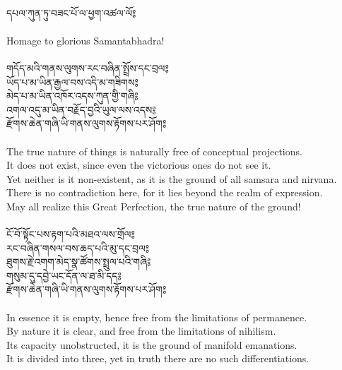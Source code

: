 

\\

\scriptsize
\ti དཔལ་ཀུན་ཏུ་བཟང་པོ་ལ་ཕྱག་འཚལ་ལོ༔\\
\\
\ru Homage to glorious Samantabhadra!
\normalsize
\\
\\
\ti
གདོད་མའི་གནས་ལུགས་རང་བཞིན་སྤྲོས་དང་བྲལ༔\\
ཡོད་པ་མ་ཡིན་རྒྱལ་བས་འདི་མ་གཟིགས༔\\
མེད་པ་མ་ཡིན་འཁོར་འདས་ཀུན་གྱི་གཞི༔\\
འགལ་འདུ་མ་ཡིན་བརྗོད་བྱའི་ཡུལ་ལས་འདས༔\\
རྫོགས་ཆེན་གཞི་ཡི་གནས་ལུགས་རྟོགས་པར་ཤོག༔\\
\\
\ru The true nature of things is naturally free of conceptual projections.\\
It does not exist, since even the victorious ones do not see it.\\
Yet neither is it non-existent, as it is the ground of all samsara and nirvana.\\
There is no contradiction here, for it lies beyond the realm of expression.\\
May all realize this Great Perfection, the true nature of the ground!\\
\\
\newpage
\ti ངོ་བོ་སྟོང་པས་རྟག་པའི་མཐའ་ལས་གྲོལ༔\\
རང་བཞིན་གསལ་བས་ཆད་པའི་མུ་དང་བྲལ༔\\
ཐུགས་རྗེ་འགག་མེད་སྣ་ཚོགས་སྤྲུལ་པའི་གཞི༔\\
གསུམ་དུ་དབྱེ་ཡང་དོན་ལ་ཐ་མི་དད༔\\
རྫོགས་ཆེན་གཞི་ཡི་གནས་ལུགས་རྟོགས་པར་ཤོག༔\\
\\
\ru In essence it is empty, hence free from the limitations of permanence.\\
By nature it is clear, and free from the limitations of nihilism.\\
Its capacity unobstructed, it is the ground of manifold emanations.\\
It is divided into three, yet in truth there are no such differentiations.\\
